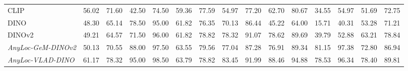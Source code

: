 \begin{table}[H]
{\begin{tabular}{lcccccccccccccc}
CLIP                                   & 56.02                          & 71.60                          & 42.50                            & 74.50                           & 59.36                          & 77.59                         & 54.97                          & 77.20                         & 62.70                         & 80.67                         & 34.55                        & 54.97                        & 51.69                    & 72.75                    \\
DINO                                   & 48.30                          & 65.14                          & 78.50                            & 95.00                           & 61.82                          & 76.35                         & 70.13                          & 86.44                         & 45.22                         & 64.00                         & 15.71                        & 40.31                        & 53.28                    & 71.21                    \\
DINOv2                                 & 49.21                          & 64.57                          & 71.50                            & 96.00                           & 61.82                          & 78.82                         & 78.32                          & 91.07                         & 78.62                         & 89.69                         & 39.79                        & 52.88                        & 63.21                    & 78.84                    \\
\rowcolor[HTML]{FFCE93} 
\textit{AnyLoc-GeM-DINOv2}             & 50.13                          & 70.55                          & 88.00                            & 97.50                           & 63.55                          & 79.56                         & 77.04                          & 87.28                         & 76.91                         & 89.34                         & 81.15                        & 97.38                        & 72.80                    & 86.94                    \\
\rowcolor[HTML]{FFCE93} 
\textit{AnyLoc-VLAD-DINO}              & 61.17                          & 78.32                          & 95.00                            & 98.50                           & 63.79                          & 78.82                         & 83.45                          & 91.99                         & 88.46                         & 94.88                         & 78.53                        & 96.34                        & 78.40                    & 89.81                    \\

\end{tabular}}
\end{table}
